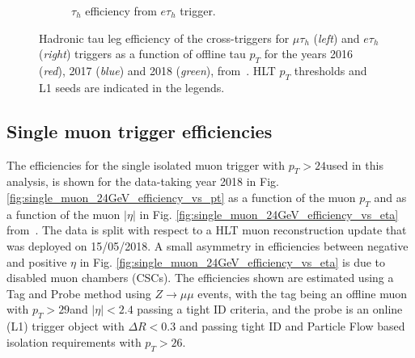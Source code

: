 \begin{figure}[ht]
\begin{subfigure}{0.45\textwidth}
        \caption{$\tau_{h}$ efficiency from $e\tau_{h}$ trigger.}
        \label{fig:etauEfficiencyPt_eachYear_mediumTauMVA_Data}
    \end{subfigure}
    \caption[Hadronic tau leg efficiency of the cross-triggers for $\mu\tau_{h}$ (\textit{left}) and $e\tau_{h}$ (\textit{right}) triggers as a function of offline tau $p_{T}$ for 2016, 2017, and 2018.]{Hadronic tau leg efficiency of the cross-triggers for $\mu\tau_{h}$ (\textit{left}) and $e\tau_{h}$ (\textit{right}) triggers as a function of offline tau $p_{T}$ for the years 2016 (\textit{red}), 2017 (\textit{blue}) and 2018 (\textit{green}), from~\cite{twiki_Tau_Lepton_Run_2_trigger_performance}. HLT $p_{T}$ thresholds and L1 seeds are indicated in the legends.} 
\end{figure}


\subsection{Single muon trigger efficiencies}
The efficiencies for the single isolated muon trigger with $p_{T} > 24$\GeV used in this analysis, is shown for the data-taking year 2018 in Fig. \ref{fig:single_muon_24GeV_efficiency_vs_pt} as a function of the muon $p_{T}$ and as a function of the muon $|\eta|$ in Fig. \ref{fig:single_muon_24GeV_efficiency_vs_eta} from~\cite{CMS-DP-2018-034}. The data is split with respect to a HLT muon reconstruction update that was deployed on 15/05/2018. A small asymmetry in efficiencies between negative and positive $\eta$ in Fig. \ref{fig:single_muon_24GeV_efficiency_vs_eta} is due to disabled muon chambers (CSCs). The efficiencies shown are estimated using a Tag and Probe method using $Z\rightarrow \mu\mu$ events, with the tag being an offline muon with $p_{T} > 29$\GeV and $|\eta| < 2.4$ passing a tight ID criteria, and the probe is an online (L1) trigger object with $\Delta R < 0.3$ and passing tight ID and Particle Flow based isolation requirements with $p_{T} > 26$\GeV.

